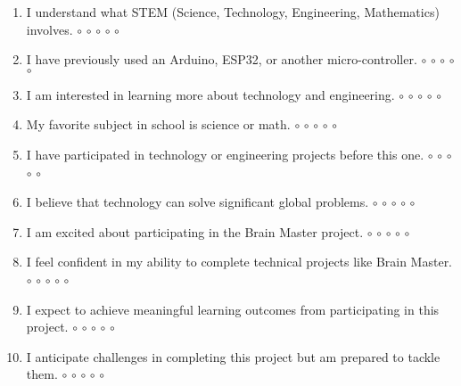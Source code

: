 \documentclass[10pt]{extarticle}
\begin{document}
\begin{enumerate}[label=\arabic*.]
    \vspace{3mm}
    \item I understand what STEM (Science, Technology, Engineering, Mathematics) involves. \hfill $\circ$ $\circ$ $\circ$ $\circ$ $\circ$
    \vspace{3mm}
    
    \item I have previously used an Arduino, ESP32, or another micro-controller. \hfill $\circ$ $\circ$ $\circ$ $\circ$ $\circ$
    \vspace{3mm}
    
    \item I am interested in learning more about technology and engineering. \hfill $\circ$ $\circ$ $\circ$ $\circ$ $\circ$
    \vspace{3mm}
    
    \item My favorite subject in school is science or math. \hfill $\circ$ $\circ$ $\circ$ $\circ$ $\circ$
    \vspace{3mm}
    
    \item I have participated in technology or engineering projects before this one. \hfill $\circ$ $\circ$ $\circ$ $\circ$ $\circ$
    \vspace{3mm}
    
    \item I believe that technology can solve significant global problems. \hfill $\circ$ $\circ$ $\circ$ $\circ$ $\circ$
    \vspace{3mm}
    
    \item I am excited about participating in the Brain Master project. \hfill $\circ$ $\circ$ $\circ$ $\circ$ $\circ$
    \vspace{3mm}
    
    \item I feel confident in my ability to complete technical projects like Brain Master. \hfill $\circ$ $\circ$ $\circ$ $\circ$ $\circ$
    \vspace{3mm}
    
    \item I expect to achieve meaningful learning outcomes from participating in this project. \hfill $\circ$ $\circ$ $\circ$ $\circ$ $\circ$
    \vspace{3mm}
    
    \item I anticipate challenges in completing this project but am prepared to tackle them. \hfill $\circ$ $\circ$ $\circ$ $\circ$ $\circ$
    \vspace{3mm}

\end{enumerate}
\end{document}
